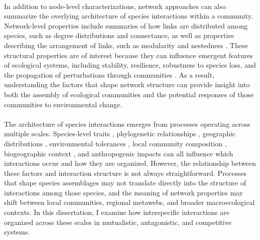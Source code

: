 \paragraph*{} In addition to node-level characterizations, network approaches can also summarize the overlying architecture of species interactions within a community. Network-level properties include summaries of how links are distributed among species, such as degree distributions and connectance, as well as properties describing the arrangement of links, such as modularity and nestedness \parencite{bascompte2003nested, bascompte2006asymmetric}. These structural properties are of interest because they can influence emergent features of ecological systems, including stability, resilience, robustness to species loss, and the propagation of perturbations through communities \parencite{thebault2010stability, suweis2013emergence, bascompte2022resilience, martins2024propagation}. As a result, understanding the factors that shape network structure can provide insight into both the assembly of ecological communities and the potential responses of those communities to environmental change.

\paragraph*{} The architecture of species interactions emerges from processes operating across multiple scales. Species-level traits \parencite{rafferty2013, ramos2018fruit}, phylogenetic relationships \parencite{eriksson2016evolution}, geographic distributions \parencite{moulatlet2023species}, environmental tolerances \parencite{slatyer2013niche}, local community composition \parencite{saravia2022ecological}, biogeographic context \parencite{sugiura2010, dalsgaard2013, traveset2016, nogales2024review}, and anthropogenic impacts \parencite{teixido2022anthropogenic, cruz2023mutualisms, birkenbach2024land} can all influence which interactions occur and how they are organized. However, the relationship between these factors and interaction structure is not always straightforward. Processes that shape species assemblages may not translate directly into the structure of interactions among those species, and the meaning of network properties may shift between local communities, regional metawebs, and broader macroecological contexts. In this dissertation, I examine how interspecific interactions are organized across these scales in mutualistic, antagonistic, and competitive systems.


